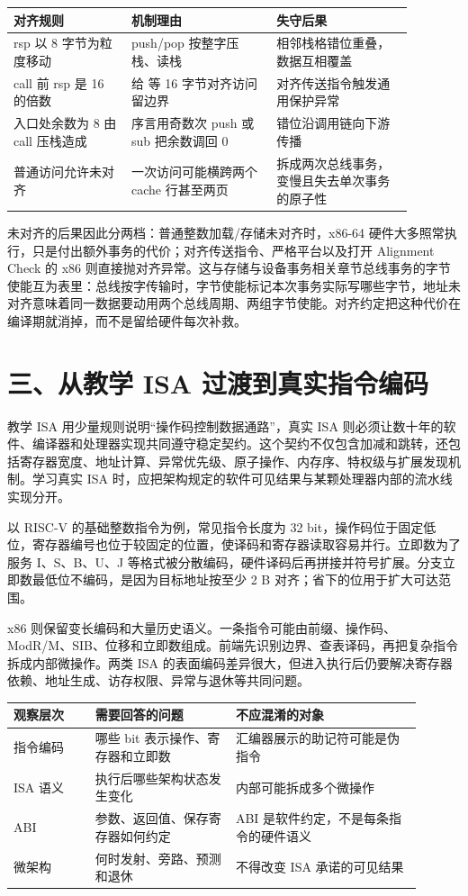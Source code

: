 \begin{longtable}{L{0.26\linewidth}L{0.32\linewidth}L{0.3\linewidth}}
\toprule
对齐规则 & 机制理由 & 失守后果 \\
\midrule
rsp 以 8 字节为粒度移动 & push/pop 按整字压栈、读栈 & 相邻栈格错位重叠，数据互相覆盖 \\\tablerowrule
call 前 rsp 是 16 的倍数 & 给  等 16 字节对齐访问留边界 & 对齐传送指令触发通用保护异常 \\\tablerowrule
入口处余数为 8 由 call 压栈造成 & 序言用奇数次 push 或 sub 把余数调回 0 & 错位沿调用链向下游传播 \\\tablerowrule
普通访问允许未对齐 & 一次访问可能横跨两个 cache 行甚至两页 & 拆成两次总线事务，变慢且失去单次事务的原子性 \\
\bottomrule
\end{longtable}

未对齐的后果因此分两档：普通整数加载/存储未对齐时，x86-64 硬件大多照常执行，只是付出额外事务的代价；对齐传送指令、严格平台以及打开 Alignment Check 的 x86 则直接抛对齐异常。这与存储与设备事务相关章节总线事务的字节使能互为表里：总线按字传输时，字节使能标记本次事务实际写哪些字节，地址未对齐意味着同一数据要动用两个总线周期、两组字节使能。对齐约定把这种代价在编译期就消掉，而不是留给硬件每次补救。

\section{三、从教学 ISA 过渡到真实指令编码}

教学 ISA 用少量规则说明“操作码控制数据通路”，真实 ISA 则必须让数十年的软件、编译器和处理器实现共同遵守稳定契约。这个契约不仅包含加减和跳转，还包括寄存器宽度、地址计算、异常优先级、原子操作、内存序、特权级与扩展发现机制。学习真实 ISA 时，应把架构规定的软件可见结果与某颗处理器内部的流水线实现分开。

以 RISC-V 的基础整数指令为例，常见指令长度为 32 bit，操作码位于固定低位，寄存器编号也位于较固定的位置，使译码和寄存器读取容易并行。立即数为了服务 I、S、B、U、J 等格式被分散编码，硬件译码后再拼接并符号扩展。分支立即数最低位不编码，是因为目标地址按至少 2 B 对齐；省下的位用于扩大可达范围。

x86 则保留变长编码和大量历史语义。一条指令可能由前缀、操作码、ModR/M、SIB、位移和立即数组成。前端先识别边界、查表译码，再把复杂指令拆成内部微操作。两类 ISA 的表面编码差异很大，但进入执行后仍要解决寄存器依赖、地址生成、访存权限、异常与退休等共同问题。

\begin{longtable}{L{0.18\linewidth}L{0.31\linewidth}L{0.41\linewidth}}
\toprule
观察层次 & 需要回答的问题 & 不应混淆的对象 \\
\midrule
指令编码 & 哪些 bit 表示操作、寄存器和立即数 & 汇编器展示的助记符可能是伪指令 \\\tablerowrule
ISA 语义 & 执行后哪些架构状态发生变化 & 内部可能拆成多个微操作 \\\tablerowrule
ABI & 参数、返回值、保存寄存器如何约定 & ABI 是软件约定，不是每条指令的硬件语义 \\\tablerowrule
微架构 & 何时发射、旁路、预测和退休 & 不得改变 ISA 承诺的可见结果 \\
\bottomrule
\end{longtable}

